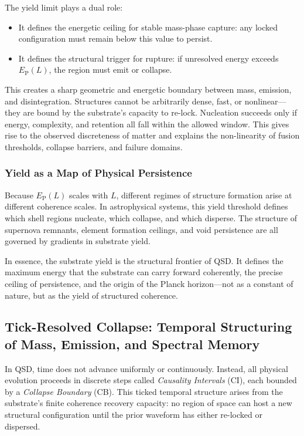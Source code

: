 \documentclass[preprints,article,submit,pdftex,moreauthors]{Definitions/mdpi}
\begin{document}
The yield limit plays a dual role:
\begin{itemize}
    \item It defines the energetic ceiling for stable mass-phase capture: any locked configuration must remain below this value to persist.
    \item It defines the structural trigger for rupture: if unresolved energy exceeds \( E_{\mathrm{P}}(L) \), the region must emit or collapse.
\end{itemize}

This creates a sharp geometric and energetic boundary between mass, emission, and disintegration. Structures cannot be arbitrarily dense, fast, or nonlinear—they are bound by the substrate's capacity to re-lock. Nucleation succeeds only if energy, complexity, and retention all fall within the allowed window. This gives rise to the observed discreteness of matter and explains the non-linearity of fusion thresholds, collapse barriers, and failure domains.

\subsubsection*{Yield as a Map of Physical Persistence}

Because \( E_{\mathrm{P}}(L) \) scales with \( L \), different regimes of structure formation arise at different coherence scales. In astrophysical systems, this yield threshold defines which shell regions nucleate, which collapse, and which disperse. The structure of supernova remnants, element formation ceilings, and void persistence are all governed by gradients in substrate yield.

In essence, the substrate yield is the structural frontier of QSD. It defines the maximum energy that the substrate can carry forward coherently, the precise ceiling of persistence, and the origin of the Planck horizon—not as a constant of nature, but as the yield of structured coherence.

\subsection{Tick-Resolved Collapse: Temporal Structuring of Mass, Emission, and Spectral Memory}

In QSD, time does not advance uniformly or continuously. Instead, all physical evolution proceeds in discrete steps called \emph{Causality Intervals} (CI), each bounded by a \emph{Collapse Boundary} (CB). This ticked temporal structure arises from the substrate’s finite coherence recovery capacity: no region of space can host a new structural configuration until the prior waveform has either re-locked or dispersed.
\end{document}
